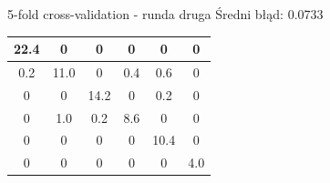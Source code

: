 \documentclass{beamer}
\begin{document}
\begin{frame}{5-fold cross-validation - runda druga}
 Średni błąd: 0.0733
\vspace{0.5cm}

\begin{center}
{\LARGE 
\begin{tabular}{ | c | c | c | c | c | c |}
\hline
   22.4  &       0  &       0  &       0  &       0  &       0 \\ \hline
    0.2  & 11.0  &       0  &  0.4  &  0.6  &       0 \\ \hline
         0  &       0  & 14.2  &       0  &  0.2  &       0 \\ \hline
         0  &  1.0  &  0.2  &  8.6  &       0  &       0 \\ \hline
         0  &       0  &       0  &       0  & 10.4  &       0 \\ \hline
         0  &       0  &       0  &       0  &       0  &  4.0 \\ \hline
\end{tabular}
}
\end{center}
\end{frame}
\end{document}
